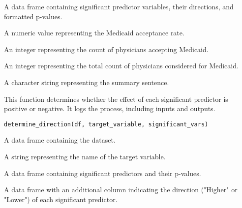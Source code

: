 \documentclass[a4paper]{book}
\begin{document}
%
\begin{Arguments}
\begin{ldescription}
\item[\code{significant\_vars}] A data frame containing significant predictor variables, their directions, and formatted p-values.

\item[\code{medicaid\_acceptance\_rate}] A numeric value representing the Medicaid acceptance rate.

\item[\code{count\_accepts\_medicaid}] An integer representing the count of physicians accepting Medicaid.

\item[\code{count\_medicaid\_insurance}] An integer representing the total count of physicians considered for Medicaid.
\end{ldescription}
\end{Arguments}
%
\begin{Value}
A character string representing the summary sentence.
\end{Value}
%
\begin{Description}
This function determines whether the effect of each significant predictor is positive or negative.
It logs the process, including inputs and outputs.
\end{Description}
%
\begin{Usage}
\begin{verbatim}
determine_direction(df, target_variable, significant_vars)
\end{verbatim}
\end{Usage}
%
\begin{Arguments}
\begin{ldescription}
\item[\code{df}] A data frame containing the dataset.

\item[\code{target\_variable}] A string representing the name of the target variable.

\item[\code{significant\_vars}] A data frame containing significant predictors and their p-values.
\end{ldescription}
\end{Arguments}
%
\begin{Value}
A data frame with an additional column indicating the direction ("Higher" or "Lower") of each significant predictor.
\end{Value}
\end{document}
